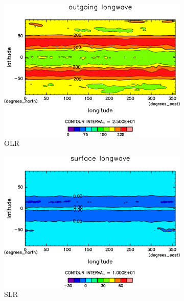 \documentclass[body]{subfiles}
\begin{document}
\begin{figure}[t]
	\centering
	\begin{subfigure}{.4\textwidth}
		\centering
		\includegraphics[width=\columnwidth]{S1800/OLR,time=3650:4015-crop-rotate.pdf}
		\caption{OLR \hmu*{[W/m^{-2}]}}\label{S1800OLR}
	\end{subfigure}
	\begin{subfigure}{.4\textwidth}
		\centering
		\includegraphics[width=\columnwidth]{S1800/SLR,time=3650:4015-crop-rotate.pdf}
		\caption{SLR\hmu*{[W/m^{-2}]}}\label{S1800SLR}
	\end{subfigure}
	\begin{subfigure}{.4\textwidth}
		\centering

\end{subfigure}
\end{figure}
\end{document}
